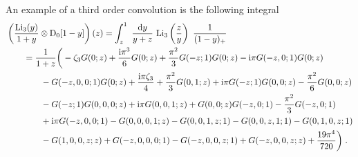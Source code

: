 \documentclass[12pt]{article}
\DeclareRobustCommand{\nn}{\nonumber}
\DeclareRobustCommand{\rd}{\ensuremath{\mathrm{d}}}
\DeclareRobustCommand{\ri}{\ensuremath{\mathrm{i}}\xspace}
\begin{document}
\begin{appendix}
An example of a third order convolution is the following integral
\begin{align}
  &\left(\frac{{\rm Li}_{3}( y) }{1+y}\otimes {\rm D}_{0}[1-y]\right)(z) 
  = 
  \int^{1}_{z}~\frac{\rd y}{y+z}~{\rm Li}_{3}\left(\frac{z}{y}\right)~\frac{1}{(1-y)_{+}}  
  \nn\\&\qquad
  = \frac{1}{1+z}\bigg(-  \zeta_{3} G(0;z)+\frac{\ri \pi ^3 }{6 }G(0;z)
  +\frac{\pi ^2}{3}G(-z;1) G(0;z)- \ri \pi  G(-z,0;1)G(0;z)
  \nn\\&\qquad\qquad
  -G(-z,0,0;1) G(0;z)
  +\frac{\ri\pi  \zeta_{3}}{4}+\frac{\pi ^2 }{3 }G(0,1;z)
   +\ri \pi  G(-z;1) G(0,0;z)-\frac{\pi ^2 }{6 }G(0,0;z)
  \nn\\&\qquad\qquad
  -G(-z;1) G(0,0,0;z)+\ri \pi G(0,0,1;z)
  +G(0,0;z)G(-z,0;1)-\frac{\pi ^2 }{3}G(-z,0;1)
  \nn\\&\qquad\qquad
  +\ri \pi G(-z,0,0;1)-G(0,0,0,1;z)
  -G(0,0,1,z;1)-G(0,0,z,1;1)-G(0,1,0,z;1)
  \nn\\&\qquad\qquad
  -G(1,0,0,z;z)+G(-z,0,0,0;1)
  -G(-z,0,0,z;1)+G(-z,0,0,z;z) +\frac{19 \pi ^4}{720 }\bigg) \;.
  \label{Convoexamp}
\end{align}


\end{appendix}
\end{document}
